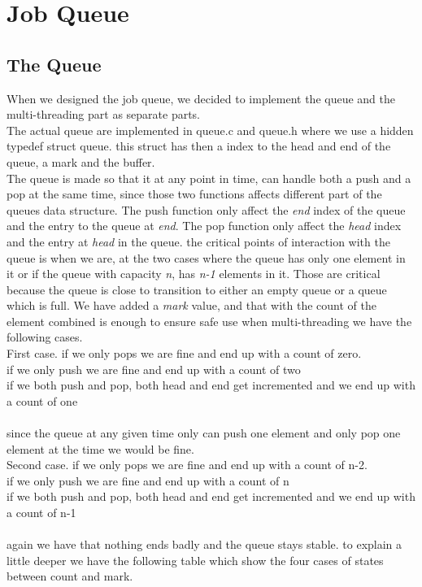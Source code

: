 
\section{Job Queue}
\subsection{The Queue}
When we designed the job queue, we decided to implement the queue and the multi-threading part as separate parts.
\\[10pt]
The actual queue are implemented in queue.c and queue.h where we use a hidden typedef struct queue.
this struct has then a index to the head and end of the queue, a mark and the buffer.
\\[10pt]
The queue is made so that it at any point in time, can handle both a push and a pop at the same time, since those two functions affects different part of the queues data structure. The push function only affect the \textit{end} index of the queue and the entry to the queue at \textit{end}. The pop function only affect the \textit{head} index and the entry at \textit{head} in the queue. the critical points of interaction with the queue is when we are, at the two cases where the queue has only one element in it or if the queue with capacity \textit{n}, has \textit{n-1} elements in it. Those are critical because the queue is close to transition to either an empty queue or a queue which is full. We have added a \textit{mark} value, and that with the count of the element combined is enough to ensure safe use when multi-threading we have the following cases.
\\[10pt]
First case.
    if we only pops we are fine and end up with a count of zero.\\
	if we only push we are fine and end up with a count of two\\
	if we both push and pop, both head and end get incremented and we end up with a count of one\\
\\[10pt]
since the queue at any given time only can push one element and only pop one element at the time we would be fine.
\\[10pt]
Second case.
	if we only pops we are fine and end up with a count of n-2.\\
	if we only push we are fine and end up with a count of n\\
	if we both push and pop, both head and end get incremented and we end up with a count of n-1\\
\\[10pt]
again we have that nothing ends badly and the queue stays stable.
to explain a little deeper we have the following table which show the four cases of states between count and mark.

